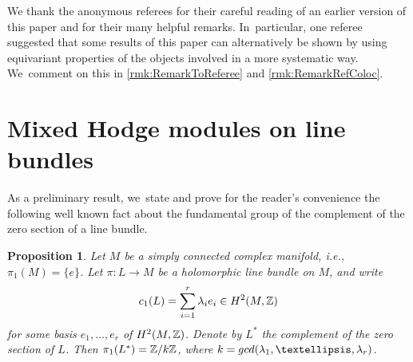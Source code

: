 \documentclass[11pt]{article}
\newcommand{\ie}{i.e.,\xspace}
\let\ra\rightarrow
\newtheorem{prop}[thm]{Proposition}
\begin{document}
We thank the anonymous referees for their careful reading of an earlier version of this paper and for their many helpful remarks. In~particular, one referee suggested that some results of this paper can alternatively be shown by using equivariant properties of the objects involved in a more systematic way. We~comment on this in \cref{rmk:RemarkToReferee} and \cref{rmk:RemarkRefColoc}.

\section{Mixed Hodge modules on line bundles} \label{sec:OBeta}

As a preliminary result, we~state and prove for the reader's convenience the following well known fact about the fundamental group of the complement of the zero section of a line bundle.

\begin{prop}\label{prop:PiEinsLStern}
Let $M$ be a simply connected complex manifold, \ie \hbox{$\pi_1(M)\!=\! \{e\}$}. Let $ \pi: L \ra M$ be a holomorphic line bundle on $M$, and write
\[
c_1(L)=\sum_{i=1}^r \lambda_i e_i \in H^2(M,{\mathbb Z})
\]
for some basis $e_1,\ldots,e_r$ of $H^2(M,{\mathbb Z})$.
Denote by $L^*$ the complement of the zero section of $L$. Then $\pi_1(L^*)={\mathbb Z}/k {\mathbb Z}$, where $k=\textup{gcd}(\lambda_1,\ldots,\lambda_r)$.
\end{prop}
\end{document}

